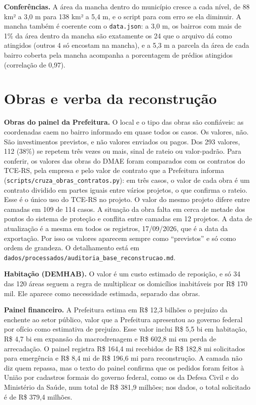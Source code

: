 \documentclass[11pt,a4paper]{article}
\newcommand{\campo}[1]{\texttt{#1}}
\begin{document}
\textbf{Conferências.} A área da mancha dentro do município cresce a cada nível, de 88 km² a 3,0 m para 138 km² a 5,4 m, e o script para com erro se ela diminuir. A mancha também é coerente com o \campo{data.json}: a 3,0 m, os bairros com mais de 1\% da área dentro da mancha são exatamente os 24 que o arquivo dá como atingidos (outros 4 só encostam na mancha), e a 5,3 m a parcela da área de cada bairro coberta pela mancha acompanha a porcentagem de prédios atingidos (correlação de 0,97).

\section{Obras e verba da reconstrução}
\label{sec:obras}

\textbf{Obras do painel da Prefeitura.} O local e o tipo das obras são confiáveis: as coordenadas caem no bairro informado em quase todos os casos. Os valores, não. São investimentos previstos, e não valores enviados ou pagos. Dos 293 valores, 112 (38\%) se repetem três vezes ou mais, sinal de rateio ou valor-padrão. Para conferir, os valores das obras do DMAE foram comparados com os contratos do TCE-RS, pela empresa e pelo valor de contrato que a Prefeitura informa (\campo{scripts/cruza\_obras\_contratos.py}): em três casos, o valor de cada obra é um contrato dividido em partes iguais entre vários projetos, o que confirma o rateio. Esse é o único uso do TCE-RS no projeto. O valor do mesmo projeto difere entre camadas em 109 de 114 casos. A situação da obra falta em cerca de metade dos pontos do sistema de proteção e conflita entre camadas em 12 projetos. A data de atualização é a mesma em todos os registros, 17/09/2026, que é a data da exportação. Por isso os valores aparecem sempre como ``previstos'' e só como ordem de grandeza. O detalhamento está em \campo{dados/processados/auditoria\_base\_reconstrucao.md}.

\textbf{Habitação (DEMHAB).} O valor é um custo estimado de reposição, e só 34 das 120 áreas seguem a regra de multiplicar os domicílios inabitáveis por R\$ 170 mil. Ele aparece como necessidade estimada, separado das obras.

\textbf{Painel financeiro.} A Prefeitura estima em R\$ 12,3 bilhões o prejuízo da enchente ao setor público, valor que a Prefeitura apresentou ao governo federal por ofício como estimativa de prejuízo. Esse valor inclui R\$ 5,5 bi em habitação, R\$ 4,7 bi em expansão da macrodrenagem e R\$ 602,8 mi em perda de arrecadação. O painel registra R\$ 164,4 mi recebidos de R\$ 182,8 mi solicitados para emergência e R\$ 8,4 mi de R\$ 196,6 mi para reconstrução. A camada não diz quem repassa, mas o texto do painel confirma que os pedidos foram feitos à União por cadastros formais do governo federal, como os da Defesa Civil e do Ministério da Saúde, num total de R\$ 381,9 milhões; nos dados, o total solicitado é de R\$ 379,4 milhões.
\end{document}
